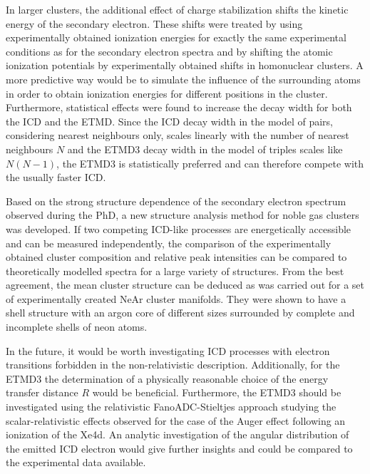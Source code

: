 In larger clusters, the additional effect of charge stabilization
shifts the kinetic energy of the secondary
electron. These shifts were treated by using experimentally obtained
ionization energies for exactly the same experimental conditions as for the
secondary electron spectra and by shifting the atomic ionization potentials
by experimentally obtained shifts in homonuclear clusters.
A more predictive way would be to simulate the influence of the surrounding
atoms in order to obtain ionization energies for different positions in
the cluster.
Furthermore, statistical effects were found to increase the decay width
for both the ICD and the ETMD. Since the ICD decay width in the model of pairs,
considering nearest neighbours only, scales linearly with the number
of nearest neighbours $N$ and the ETMD3 decay width in the model of triples
scales like $N(N-1)$,
the ETMD3 is statistically preferred and can therefore compete
with the usually faster ICD.

Based on the strong structure dependence of the secondary electron spectrum
observed during the PhD, a new
structure analysis method for noble gas clusters was developed. If two
competing ICD-like processes are energetically accessible and can be measured
independently, the comparison of the experimentally obtained cluster
composition and relative peak intensities can be compared to theoretically
modelled spectra for a large variety of structures. From the best agreement,
the mean cluster structure can be deduced as was carried out for
a set of experimentally created NeAr cluster manifolds. They were shown
to have a shell structure with an argon core of different sizes surrounded
by complete and incomplete shells of neon atoms.

In the future, it would be worth investigating \ac{ICD} processes with electron
transitions forbidden in the non-relativistic description.
Additionally, for the ETMD3 the determination of a physically reasonable
choice of the energy transfer distance $R$ would be beneficial.
Furthermore, the ETMD3 should be investigated using the relativistic
FanoADC-Stieltjes approach studying the scalar-relativistic effects observed
for the case of the Auger effect following an ionization of the Xe4d.
An analytic investigation of the angular distribution of the emitted ICD
electron would give further insights and could be compared to the experimental
data available.

